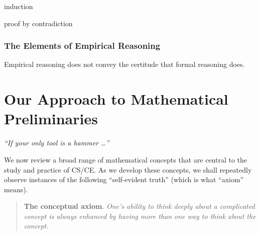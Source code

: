 induction

proof by contradiction

\subsubsection{The Elements of Empirical Reasoning}

Empirical reasoning does not convey the certitude that formal
reasoning does.  



\section{Our Approach to Mathematical Preliminaries}

\hfill{\small\em
``If your only tool is a hammer \ldots''
}

\vspace*{.25in}

\noindent
We now review a broad range of mathematical concepts that are central
to the study and practice of CS/CE.  As we develop these concepts, we
shall repeatedly observe instances of the following ``self-evident
truth'' (which is what ``axiom'' means).

\begin{quote}
{\bf The conceptual axiom}.
{\em
One's ability to think deeply about a complicated concept is always
enhanced by having more than one way to think about the concept.}
\end{quote}
